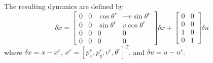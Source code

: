 The resulting dynamics are defined by
\begin{equation*}
    \delta \dot{x} = 
    \begin{bmatrix}
        0 & 0 & \cos\theta^r & -v\sin\theta^r \\
        0 & 0 & \sin\theta^r & v\cos\theta^r \\
        0 & 0 & 0 & 0 \\
        0 & 0 & 0 & 0
    \end{bmatrix} \delta x + 
    \begin{bmatrix}
        0 & 0 \\
        0 & 0 \\
        1 & 0 \\
        0 & 1
    \end{bmatrix} \delta u
\end{equation*}
where $\delta x = x - x^r$, $x^r = [p_x^r,p_y^r,v^r,\theta^r]^T$, and $\delta u
= u - u^r$.  